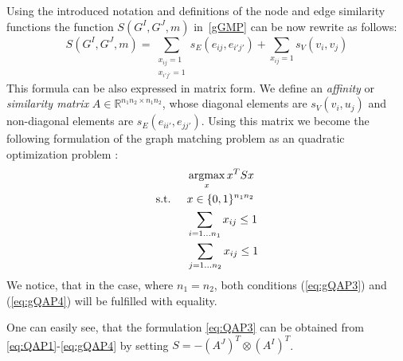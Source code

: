 Using the introduced notation and definitions of the node and edge similarity functions the function $S(G^I,G^J,m)$ in~\eqref{gGMP} can be now rewrite as follows:
\begin{equation}\label{eq:sumQAP}
	S(G^I,G^J,m)=\sum_{\substack{x_{ij}=1\\x_{i'j'}=1}}s_E(e_{ij},e_{i'j'}) + \sum_{x_{ij}=1}s_V(v_{i},v_{j})
\end{equation}
This formula can be also expressed in matrix form. We define an \emph{affinity} or \emph{similarity matrix} $A\in\mathbb{R}^{n_1n_2\times n_1n_2}$, whose diagonal elements are $s_V(v_i, u_j)$ and non-diagonal elements are $s_E(e_{ii\prime}, e_{jj\prime})$. Using this matrix we become the following formulation of the graph matching problem as an quadratic optimization problem \cite{Cho2014_Haystack, Cho2010_RRWM, Cho2012_ProgressiveGM, Conte2004,Leordeanu2009_IPFP}:
\begin{alignat}{2}
    &     && \argmax_x{x^TSx}                           \label{eq:gQAP1}\\ %
    & \text{s.t. } &&  x\in \{0,1\}^{n_1n_2}            \label{eq:gQAP2}\\
    &             &&  \sum_{i=1\dots n_1} x_{ij}\le 1    \label{eq:gQAP3}\\
    &             &&  \sum_{j=1\dots n_2} x_{ij}\le 1    \label{eq:gQAP4}
\end{alignat}
We notice, that in the case, where $n_1=n_2$, both conditions (\ref{eq:gQAP3}) and (\ref{eq:gQAP4}) will be fulfilled with equality.

One can easily see, that the formulation \eqref{eq:QAP3} can be obtained from \eqref{eq:QAP1}-\eqref{eq:gQAP4} by setting $S=-(A^J)^T\otimes(A^I)^T$.

